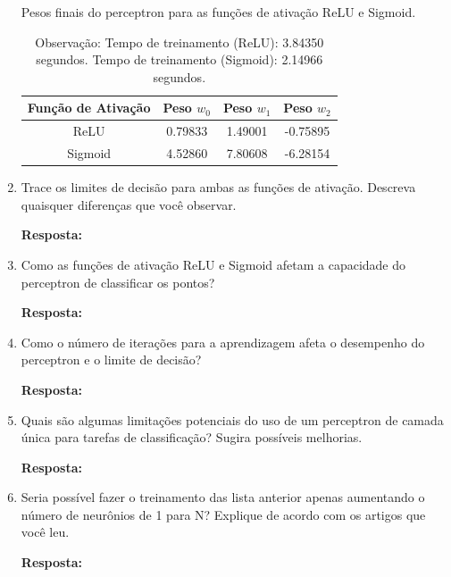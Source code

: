 \documentclass[12 pt]{article}
\begin{document}
\begin{enumerate}
    \begin{table}[h!]
        \centering
        \caption{Pesos finais do perceptron para as funções de ativação ReLU e Sigmoid.}
        \begin{tabular}{|c|c|c|c|}
            \hline
            \textbf{Função de Ativação} & \textbf{Peso} $w_0$ & \textbf{Peso} $w_1$ & \textbf{Peso} $w_2$ \\ \hline
            ReLU                        & 0.79833             & 1.49001             & -0.75895            \\ \hline
            Sigmoid                     & 4.52860             & 7.80608             & -6.28154            \\ \hline
        \end{tabular}
        \vspace{0.3cm}
        \caption*{Observação: Tempo de treinamento (ReLU): 3.84350 segundos. Tempo de treinamento (Sigmoid): 2.14966 segundos.}
        \label{tab:pesos_finais}
    \end{table}
    
    \item Trace os limites de decisão para ambas as funções de ativação. Descreva quaisquer diferenças que você observar.\par

    \textbf{Resposta:} \par
    \item Como as funções de ativação ReLU e Sigmoid afetam a capacidade do perceptron de classificar os pontos?\par

    \textbf{Resposta:} \par
    \item Como o número de iterações para a aprendizagem afeta o desempenho do perceptron e o limite de decisão?\par

    \textbf{Resposta:} \par
    \item Quais são algumas limitações potenciais do uso de um perceptron de camada única para tarefas de classificação? Sugira possíveis melhorias.\par

    \textbf{Resposta:} \par
    \item Seria possível fazer o treinamento das lista anterior apenas aumentando o número de neurônios de 1 para N? Explique de acordo com os artigos que você leu.\par

    \textbf{Resposta:} \par
\end{enumerate}
\end{document}
